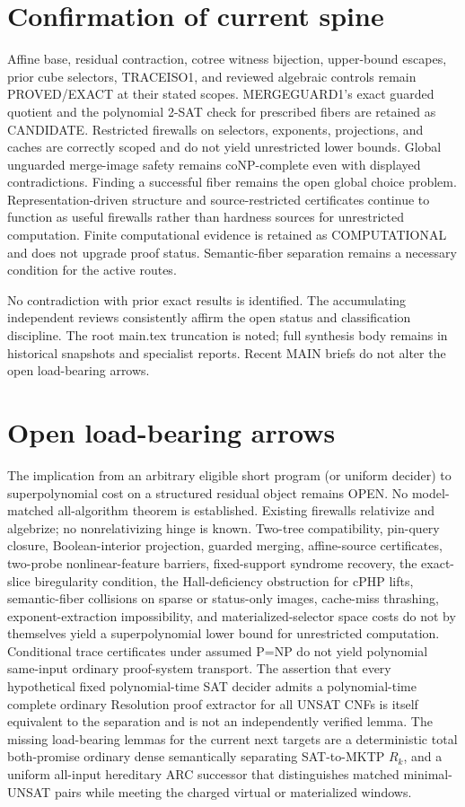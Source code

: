 \documentclass[11pt]{article}
\begin{document}
\section{Confirmation of current spine}
Affine base, residual contraction, cotree witness bijection, upper-bound escapes, prior cube selectors, TRACEISO1, and reviewed algebraic controls remain PROVED/EXACT at their stated scopes. MERGEGUARD1's exact guarded quotient and the polynomial 2-SAT check for prescribed fibers are retained as CANDIDATE. Restricted firewalls on selectors, exponents, projections, and caches are correctly scoped and do not yield unrestricted lower bounds. Global unguarded merge-image safety remains coNP-complete even with displayed contradictions. Finding a successful fiber remains the open global choice problem. Representation-driven structure and source-restricted certificates continue to function as useful firewalls rather than hardness sources for unrestricted computation. Finite computational evidence is retained as COMPUTATIONAL and does not upgrade proof status. Semantic-fiber separation remains a necessary condition for the active routes.

No contradiction with prior exact results is identified. The accumulating independent reviews consistently affirm the open status and classification discipline. The root main.tex truncation is noted; full synthesis body remains in historical snapshots and specialist reports. Recent MAIN briefs do not alter the open load-bearing arrows.

\section{Open load-bearing arrows}
The implication from an arbitrary eligible short program (or uniform decider) to superpolynomial cost on a structured residual object remains OPEN. No model-matched all-algorithm theorem is established. Existing firewalls relativize and algebrize; no nonrelativizing hinge is known. Two-tree compatibility, pin-query closure, Boolean-interior projection, guarded merging, affine-source certificates, two-probe nonlinear-feature barriers, fixed-support syndrome recovery, the exact-slice biregularity condition, the Hall-deficiency obstruction for cPHP lifts, semantic-fiber collisions on sparse or status-only images, cache-miss thrashing, exponent-extraction impossibility, and materialized-selector space costs do not by themselves yield a superpolynomial lower bound for unrestricted computation. Conditional trace certificates under assumed P=NP do not yield polynomial same-input ordinary proof-system transport. The assertion that every hypothetical fixed polynomial-time SAT decider admits a polynomial-time complete ordinary Resolution proof extractor for all UNSAT CNFs is itself equivalent to the separation and is not an independently verified lemma. The missing load-bearing lemmas for the current next targets are a deterministic total both-promise ordinary dense semantically separating SAT-to-MKTP \(R_k\), and a uniform all-input hereditary ARC successor that distinguishes matched minimal-UNSAT pairs while meeting the charged virtual or materialized windows.
\end{document}
